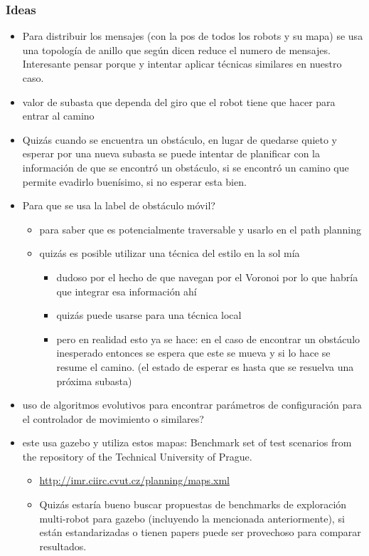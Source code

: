 \subsubsection{Ideas}
\begin{itemize}
\item Para distribuir los mensajes (con la pos de todos los robots y su mapa) se usa una topología de anillo que según dicen reduce el numero de mensajes. Interesante pensar porque y intentar aplicar técnicas similares en nuestro caso.

\item valor de subasta que dependa del giro que el robot tiene que hacer para entrar al camino

\item Quizás cuando se encuentra un obstáculo, en lugar de quedarse quieto y esperar por una nueva subasta se puede intentar de planificar con la información de que se encontró un obstáculo, si se encontró un camino que permite evadirlo buenísimo, si no esperar esta bien.

\item Para que se usa la label de obstáculo móvil?
\begin{itemize}
  \item para saber que es potencialmente traversable y usarlo en el path planning
  \item quizás es posible utilizar una técnica del estilo en la sol mía
  \begin{itemize}
    \item dudoso por el hecho de que navegan por el Voronoi por lo que habría que integrar esa información ahí
    \item quizás puede usarse para una técnica local 
    \item pero en realidad esto ya se hace: en el caso de encontrar un obstáculo inesperado entonces se espera que este se mueva y si lo hace se resume el camino. (el estado de esperar es hasta que se resuelva una próxima subasta)
  \end{itemize}
\end{itemize}

\item uso de algoritmos evolutivos para encontrar parámetros de configuración para el controlador de movimiento o similares?

\item este usa gazebo y utiliza estos mapas: Benchmark set of test scenarios from the repository of the Technical University of Prague.
\begin{itemize}
  \item \url{http://imr.ciirc.cvut.cz/planning/maps.xml}
  \item Quizás estaría bueno buscar propuestas de benchmarks de exploración multi-robot para gazebo (incluyendo la mencionada anteriormente), si están estandarizadas o tienen papers puede ser provechoso para comparar resultados.
\end{itemize}


\end{itemize}
